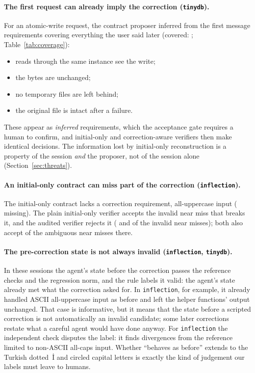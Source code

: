 \paragraph{The first request can already imply the correction (\texttt{tinydb}).} For an atomic-write request, the
contract proposer inferred from the first message requirements covering everything the user said later
(covered: ; Table~\ref{tab:coverage}):
\begin{itemize}
\item reads through the same instance see the write;
\item the bytes are unchanged;
\item no temporary files are left behind;
\item the original file is intact after a failure.
\end{itemize}
These appear as \emph{inferred} requirements, which the acceptance gate requires a human to confirm, and initial-only
and correction-aware verifiers then make identical decisions. The information lost by initial-only reconstruction is a
property of the session \emph{and} the proposer, not of the session alone (Section~\ref{sec:threats}).

\paragraph{An initial-only contract can miss part of the correction (\texttt{inflection}).} The initial-only contract
lacks a correction requirement, all-uppercase input ( missing). The plain initial-only
verifier accepts the invalid near miss that breaks it, and the audited verifier rejects it ( and
 of the invalid near misses); both also accept  of the ambiguous near misses there.

\paragraph{The pre-correction state is not always invalid (\texttt{inflection}, \texttt{tinydb}).} In these sessions
the agent's state before the correction passes the reference checks and the regression norm, and the rule labels it
valid: the agent's state already met what the correction asked for. In \texttt{inflection}, for example, it already
handled ASCII all-uppercase input as before and left the helper functions' output unchanged. That case is informative,
but it means that the state before a scripted correction is not automatically an invalid candidate; some later
corrections restate what a careful agent would have done anyway. For \texttt{inflection} the independent check disputes
the label: it finds divergences from the reference limited to non-ASCII all-caps input. Whether ``behaves as before''
extends to the Turkish dotted~İ and circled capital letters is exactly the kind of judgement our labels must leave to
humans.

